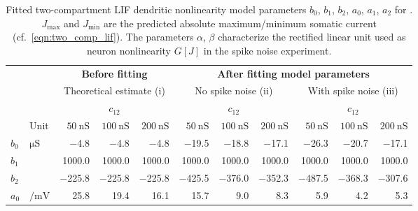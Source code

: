\begin{table}[h!]
	\fontsize{10pt}{1.25}\selectfont
	\caption[Fitted two-compartment LIF dendritic nonlinearity model parameters]{Fitted two-compartment LIF dendritic nonlinearity model parameters $b_0$, $b_1$, $b_2$, $a_0$, $a_1$, $a_2$ for .
	$J_\mathrm{max}$ and $J_\mathrm{min}$ are the predicted absolute maximum/minimum somatic current (cf.~\cref{eqn:two_comp_lif}).
	The parameters $\alpha$, $\beta$ characterize the rectified linear unit used as neuron nonlinearity $G[J]$ in the spike noise experiment.}
	\renewcommand{\arraystretch}{1.2}
	\small
	\centering
	\sffamily
	\vspace{0.25cm}
	\begin{tabular}{l l   r r r   r r r   r r r}
		\toprule
			& & \multicolumn{3}{c}{\textbf{Before fitting}} & \multicolumn{6}{c}{\textbf{After fitting model parameters}} \\
		\cmidrule(l){3-5}
		\cmidrule(l){6-11}
		& & \multicolumn{3}{c}{Theoretical estimate (i)} &
		    \multicolumn{3}{c}{No spike noise (ii)} &
		    \multicolumn{3}{c}{With spike noise (iii)} \\
		\cmidrule(l){3-5}
		\cmidrule(l){6-8}
		\cmidrule(l){9-11}
		& & \multicolumn{3}{c}{$c_{12}$} &
		\multicolumn{3}{c}{$c_{12}$} &
		\multicolumn{3}{c}{$c_{12}$} \\
		& Unit &
		$\SI{50}{\nano\siemens}$ &
		$\SI{100}{\nano\siemens}$ &		
		$\SI{200}{\nano\siemens}$ &		
		$\SI{50}{\nano\siemens}$ &
		$\SI{100}{\nano\siemens}$ &
		$\SI{200}{\nano\siemens}$ &
		$\SI{50}{\nano\siemens}$ &
		$\SI{100}{\nano\siemens}$ &		
		$\SI{200}{\nano\siemens}$ \\
		\cmidrule(r){1-2}
		\cmidrule(l){3-5}
		\cmidrule(l){6-8}
		\cmidrule(l){9-11}

		$b_0$ & $\si{\micro\siemens}$ &
		\num{-4.8} & \num{-4.8} & \num{-4.8} &
		\num{-19.5} & \num{-18.8} & \num{-17.1} &
		\num{-26.3} & \num{-20.7} & \num{-17.1}
		\\

		$b_1$ & &
		\num{1000.0} & \num{1000.0} & \num{1000.0} &
		\num{1000.0} & \num{1000.0} & \num{1000.0} &
		\num{1000.0} & \num{1000.0} & \num{1000.0} \\

		$b_2$ & &
		\num{-225.8} & \num{-225.8} & \num{-225.8} &
		\num{-425.5} & \num{-376.0} & \num{-352.3} &
		\num{-487.5} & \num{-368.3} & \num{-307.6} \\

		$a_0$ & $\si{\per\milli\volt}$ &
		\num{25.8} & \num{19.4} & \num{16.1} &
		\num{15.7} & \num{9.0} & \num{8.3} &
		\num{5.9} & \num{4.2} & \num{5.3} \\


\end{tabular}
\end{table}
